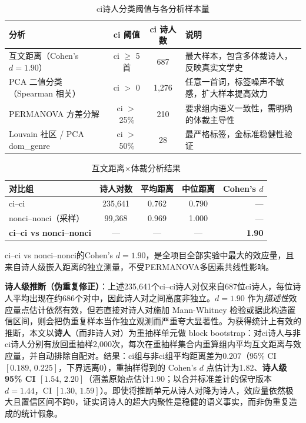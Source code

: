 \documentclass[12pt,a4paper]{article}
\numberwithin{equation}{section}
\begin{document}
\begin{table}[htbp]
  \centering
  \caption{ci诗人分类阈值与各分析样本量}
  \label{tab:threshold}
  \begin{tabular}{lccp{7.5cm}}
    \toprule
    分析 & ci 阈值 & ci 诗人数 & 说明 \\
    \midrule
    互文距离（Cohen's $d=1.90$） & ci $\ge$ 5首 & 687 & 最大样本，包含多体裁诗人，反映真实文学史 \\
    PCA 二值分类（Spearman 相关） & ci $>$ 0 & 1,276 & 任意一首词，标签噪声不敏感，扩大样本提高效力 \\
    PERMANOVA 方差分解 & ci $>$ 25\% & 210 & 要求组内语义一致性，需明确的体裁主导性 \\
    Louvain 社区 / PCA dom\_genre & ci $>$ 50\% & 28 & 最严格标签，金标准稳健性验证 \\
    \bottomrule
  \end{tabular}
\end{table}

\begin{table}[htbp]
  \centering
  \caption{互文距离$\times$体裁分析结果}
  \label{tab:intertextual}
  \begin{tabular}{lcccr}
    \toprule
    对比组              & 诗人对数   & 平均距离 & 中位距离 & Cohen's $d$ \\
    \midrule
    ci--ci              & 235,641    & 0.762    & 0.790    & ---         \\
    nonci--nonci（采样）&  99,368    & 0.969    & 1.000    & ---         \\
    \textbf{ci--ci vs nonci--nonci} & --- & --- & --- & \textbf{1.90}\footnotemark \\
    \bottomrule
  \end{tabular}
\end{table}

ci--ci vs nonci--nonci的Cohen's $d=1.90$，是全项目全部实验中最大的效应量，且来自诗人级嵌入距离的独立测量，不受PERMANOVA多因素共线性影响。

\textbf{诗人级推断（伪重复修正）}：上述235,641个ci--ci诗人对仅来自687位ci诗人，每位诗人平均出现在约686个对中，因此诗人对之间高度非独立。$d=1.90$ 作为\emph{描述性}效应量点估计依然有效，但若直接对诗人对施加 Mann-Whitney 检验或据此构造置信区间，则会把伪重复样本当作独立观测而严重夸大显著性。为获得统计上有效的推断，本文以\textbf{诗人}（而非诗人对）为重抽样单元做 block bootstrap：对ci诗人与非ci诗人分别有放回重抽样2{,}000次，每次在重抽样集合内重算组内平均互文距离与效应量，并自动排除自配对。结果：ci组与非ci组平均距离差为$0.207$（95\% CI $[0.189,\,0.225]$，下界远离0），重抽样得到的 Cohen's $d$ 点估计为1.82、\textbf{诗人级95\% CI $[1.54,\,2.20]$}（涵盖原始点估计1.90；以合并标准差计的保守版本$d=1.44$，CI $[1.30,\,1.59]$）。即使将推断单元从诗人对降为诗人，效应量依然极大且置信区间不跨0，证实词诗人的超大内聚性是稳健的语义事实，而非伪重复造成的统计假象。
\end{document}
